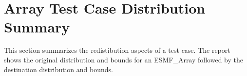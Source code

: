 \section{Array Test Case Distribution Summary}
This section summarizes the redistibution aspects of a test case. The report shows the original distribution and bounds for an ESMF\_Array followed by the destination distribution and bounds.

